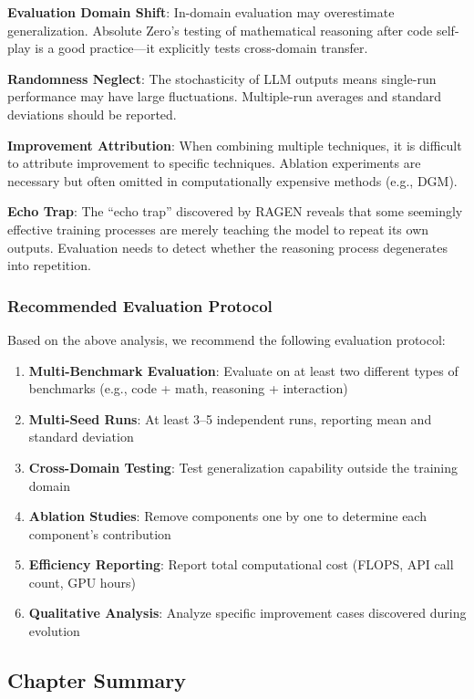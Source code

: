 \textbf{Evaluation Domain Shift}: In-domain evaluation may overestimate generalization. Absolute Zero's testing of mathematical reasoning after code self-play is a good practice---it explicitly tests cross-domain transfer.

\textbf{Randomness Neglect}: The stochasticity of LLM outputs means single-run performance may have large fluctuations. Multiple-run averages and standard deviations should be reported.

\textbf{Improvement Attribution}: When combining multiple techniques, it is difficult to attribute improvement to specific techniques. Ablation experiments are necessary but often omitted in computationally expensive methods (e.g., DGM).

\textbf{Echo Trap}: The ``echo trap'' discovered by RAGEN reveals that some seemingly effective training processes are merely teaching the model to repeat its own outputs. Evaluation needs to detect whether the reasoning process degenerates into repetition.

\subsubsection{Recommended Evaluation Protocol}

Based on the above analysis, we recommend the following evaluation protocol:

\begin{enumerate}
\item \textbf{Multi-Benchmark Evaluation}: Evaluate on at least two different types of benchmarks (e.g., code + math, reasoning + interaction)
\item \textbf{Multi-Seed Runs}: At least 3--5 independent runs, reporting mean and standard deviation
\item \textbf{Cross-Domain Testing}: Test generalization capability outside the training domain
\item \textbf{Ablation Studies}: Remove components one by one to determine each component's contribution
\item \textbf{Efficiency Reporting}: Report total computational cost (FLOPS, API call count, GPU hours)
\item \textbf{Qualitative Analysis}: Analyze specific improvement cases discovered during evolution
\end{enumerate}

\subsection{Chapter Summary}\label{sec:ch3-summary}

